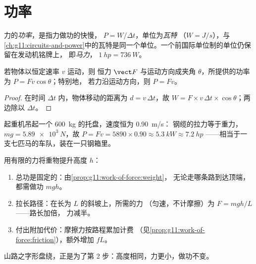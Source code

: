 \section{功率}

\begin{definition}[功率]\label{def:g11:work-of-force:power}
力的\emph{功率}，是指力做功的快慢，
$P = W/\Delta t$，单位为\emph{瓦特}
（$\unit{W} = \unit{J/s}$），与
\cref{ch:g11:circuits-and-power}中的瓦特是同一个单位。一个前国际单位制的单位仍保留在发动机铭牌上，
即\emph{马力}，
$\qty{1}{hp} = \qty{736}{W}$。
\end{definition}

\begin{proposition}[匀速时的功率]\label{prop:g11:work-of-force:pfv}
若物体以恒定速率 $v$ 运动，则
恒力 $\vect F$ 与运动方向成夹角 $\theta$，所提供的功率为
$P = F v \cos\theta$；特别地，
若力沿运动方向，则 $P = Fv$。
\end{proposition}

\begin{proof}
在时间 $\Delta t$ 内，物体移动的距离为 $d = v\,\Delta t$，故
$W = F \times v\,\Delta t \times \cos\theta$；两边除以 $\Delta t$。
\end{proof}

\begin{example}[起重机]\label{ex:g11:work-of-force:crane}
起重机吊起一个 \qty{600}{kg} 的托盘，速度恒为 \qty{0.90}{m/s}：
钢缆的拉力等于重力，$mg = \qty{5.89e3}{N}$，故
$P = Fv = 5890 \times 0.90 \approx \qty{5.3}{kW} \approx \qty{7.2}{hp}$
——相当于一支七匹马的车队，装在一只钢箱里。
\end{example}

\begin{method}\label{met:g11:work-of-force:zigzag}
用有限的力将重物提升高度 $h$：
\begin{enumerate}
  \item 总功是固定的：由\cref{prop:g11:work-of-force:weight}，
        无论走哪条路到达顶端，都需做功 $mgh$。
  \item 拉长路径：在长为 $L$ 的斜坡上，所需的力
        （匀速，不计摩擦）为 $F = mgh/L$——路长加倍，
        力减半。
  \item 付出附加代价：摩擦力按路程累加计费
        （见\cref{prop:g11:work-of-force:friction}），额外增加 $fL$。
\end{enumerate}
山路之字形盘绕，正是为了第 2 步：高度相同，力更小，做功不变。
\end{method}

